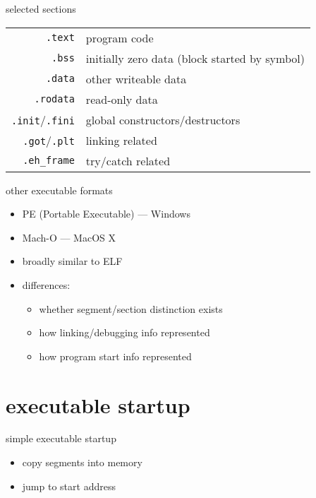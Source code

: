 \begin{frame}{selected sections}
\begin{tabular}{rl}
    {\tt .text} & program code \\
    {\tt .bss} & initially zero data {\scriptsize (block started by symbol)} \\
    {\tt .data} & other writeable data  \\
    {\tt .rodata} & read-only data \\
    {\tt .init}/{\tt .fini} & global constructors/destructors \\
    {\tt .got}/{\tt .plt} & linking related \\
    {\tt .eh\_frame} & try/catch related \\
\end{tabular}
\end{frame}


\begin{frame}{other executable formats}
    \begin{itemize}
    \item PE (Portable Executable) --- Windows
    \item Mach-O --- MacOS X
    \item broadly similar to ELF
    \item differences:  
        \begin{itemize}
        \item whether segment/section distinction exists
        \item how linking/debugging info represented
        \item how program start info represented
        \end{itemize}
    \end{itemize}
\end{frame}


\section{executable startup}

\begin{frame}{simple executable startup}
    \begin{itemize}
    \item copy segments into memory
    \item jump to start address
    \end{itemize}
\end{frame}

